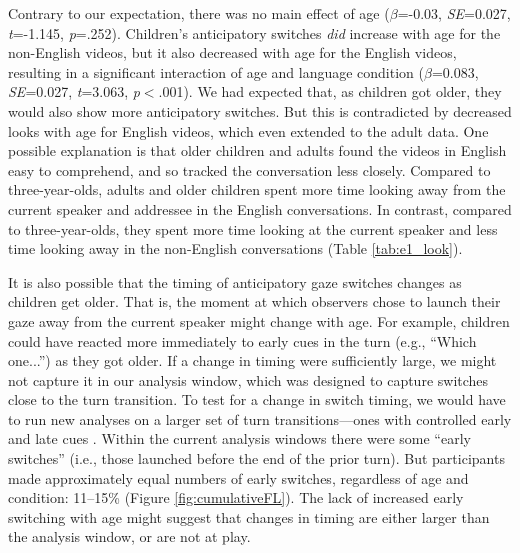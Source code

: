 \documentclass[authoryear, 12pt]{elsarticle}
\begin{document}
Contrary to our expectation, there was no main effect of age (\textit{$\beta$}=-0.03, \textit{SE}=0.027, \textit{t}=-1.145, \textit{p}=.252). Children's anticipatory switches \textit{did} increase with age for the non-English videos, but it also decreased with age for the English videos, resulting in a significant interaction of age and language condition (\textit{$\beta$}=0.083, \textit{SE}=0.027, \textit{t}=3.063, \textit{p}$<$.001). We had expected that, as children got older, they would also show more anticipatory switches. But this is contradicted by decreased looks with age for English videos, which even extended to the adult data. One possible explanation is that older children and adults found the videos in English easy to comprehend, and so tracked the conversation less closely. Compared to three-year-olds, adults and older children spent more time looking away from the current speaker and addressee in the English conversations. In contrast, compared to three-year-olds, they spent more time looking at the current speaker and less time looking away in the non-English conversations (Table \ref{tab:e1_look}).

It is also possible that the timing of anticipatory gaze switches changes as children get older. That is, the moment at which observers chose to launch their gaze away from the current speaker might change with age. For example, children could have reacted more immediately to early cues in the turn (e.g., ``Which one...'') as they got older. If a change in timing were sufficiently large, we might not capture it in our analysis window, which was designed to capture switches close to the turn transition. To test for a change in switch timing, we would have to run new analyses on a larger set of turn transitions---ones with controlled early and late cues \citep[see, e.g.,][]{bogelsmagyariInPrep}. Within the current analysis windows there were some ``early switches'' (i.e., those launched before the end of the prior turn). But participants made approximately equal numbers of early switches, regardless of age and condition: 11--15\% (Figure \ref{fig:cumulativeFL}). The lack of increased early switching with age might suggest that changes in timing are either larger than the analysis window, or are not at play.
\end{document}

